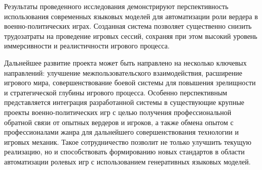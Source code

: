 Результаты проведенного исследования демонстрируют перспективность использования современных языковых моделей для автоматизации роли вердера в военно-политических играх. Созданная система позволяет существенно снизить трудозатраты на проведение игровых сессий, сохраняя при этом высокий уровень иммерсивности и реалистичности игрового процесса.

Дальнейшее развитие проекта может быть направлено на несколько ключевых направлений: улучшение межпользовательского взаимодействия, расширение игрового мира, совершенствование боевой системы для повышения зрелищности и стратегической глубины игрового процесса. Особенно перспективным представляется интеграция разработанной системы в существующие крупные проекты военно-политических игр с целью получения профессиональной обратной связи от опытных вердеров и игроков, а также обмена опытом с профессионалами жанра для дальнейшего совершенствования технологии и игровых механик. Такое сотрудничество позволит не только улучшить текущую реализацию, но и способствовать формированию новых стандартов в области автоматизации ролевых игр с использованием генеративных языковых моделей.